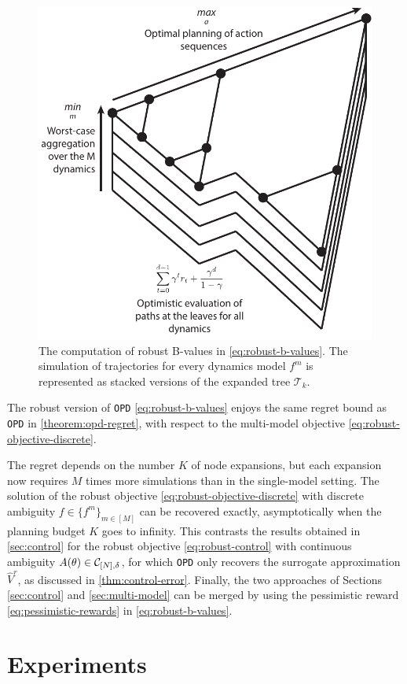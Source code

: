 \begin{figure}
	\centering
	\includegraphics[width=0.45\linewidth]{img/robust-control-tree}
	\caption{The computation of robust B-values in \eqref{eq:robust-b-values}. The simulation of trajectories for every dynamics model $f^m$ is represented as stacked versions of the expanded tree $\mathcal{T}_k$.}
	\label{fig:drop}
\end{figure}

\begin{theorem}
	\label{theorem:drop-regret}
	\begin{leftbar}[theorembar]
	The robust version of \texttt{OPD} \eqref{eq:robust-b-values} enjoys the same regret bound as \texttt{OPD} in \autoref{theorem:opd-regret}, with respect to the multi-model objective \eqref{eq:robust-objective-discrete}.
	\end{leftbar}
\end{theorem}

The regret depends on the number $K$ of node expansions, but each expansion now requires $M$ times more simulations than in the single-model setting. The solution of the robust objective \eqref{eq:robust-objective-discrete} with discrete ambiguity $f\in\{f^m\}_{m\in[M]}$ can be recovered exactly, asymptotically when the planning budget $K$ goes to infinity. This contrasts the results obtained in \autoref{sec:control} for the robust objective \eqref{eq:robust-control} with continuous ambiguity $A(\theta)\in\mathcal{C}_{[N],\delta}$, for which \texttt{OPD} only recovers the surrogate approximation $\hat{V}^r$, as discussed in \autoref{thm:control-error}. Finally, the two approaches of Sections \ref{sec:control} and \ref{sec:multi-model} can be merged by using the pessimistic reward \eqref{eq:pessimistic-rewards} in \eqref{eq:robust-b-values}.

\section{Experiments}
\label{sec:experiments}

